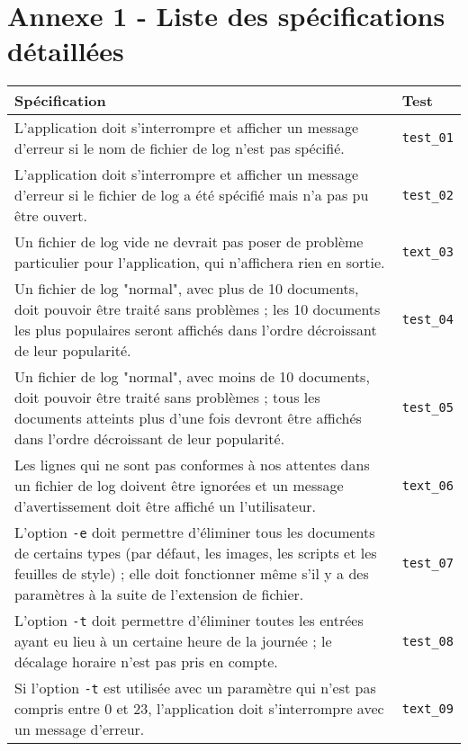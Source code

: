 \documentclass[11pt,a4paper]{article}
\begin{document}
\pagebreak
\section*{Annexe 1 - Liste des spécifications détaillées}
\label{sec:annexe_1}

\begin{center}
    \begin{table}[!h]
        \begin{tabularx}{\textwidth}{ | X | p{1.5cm} | }
            \hline
            Spécification & Test \\ \hline
            L'application doit s'interrompre et afficher un message d'erreur si le nom de fichier de log n'est pas spécifié. & \texttt{test\_01} \\ \hline
            L'application doit s'interrompre et afficher un message d'erreur si le fichier de log a été spécifié mais n'a pas pu être ouvert. & \texttt{test\_02} \\ \hline
            Un fichier de log vide ne devrait pas poser de problème particulier pour l'application, qui n'affichera rien en sortie. & \texttt{text\_03} \\ \hline
            Un fichier de log "normal", avec plus de 10 documents, doit pouvoir être traité sans problèmes ; les 10 documents les plus populaires seront affichés dans l'ordre décroissant de leur popularité. & \texttt{test\_04} \\ \hline
            Un fichier de log "normal", avec moins de 10 documents, doit pouvoir être traité sans problèmes ; tous les documents atteints plus d'une fois devront être affichés dans l'ordre décroissant de leur popularité. & \texttt{test\_05} \\ \hline
            Les lignes qui ne sont pas conformes à nos attentes dans un fichier de log doivent être ignorées et un message d'avertissement doit être affiché un l'utilisateur. & \texttt{text\_06} \\ \hline
            L'option \texttt{-e} doit permettre d'éliminer tous les documents de certains types (par défaut, les images, les scripts et les feuilles de style) ; elle doit fonctionner même s'il y a des paramètres à la suite de l'extension de fichier. & \texttt{test\_07} \\ \hline
            L'option \texttt{-t} doit permettre d'éliminer toutes les entrées ayant eu lieu à un certaine heure de la journée ; le décalage horaire n'est pas pris en compte. & \texttt{test\_08} \\ \hline
            Si l'option \texttt{-t} est utilisée avec un paramètre qui n'est pas compris entre 0 et 23, l'application doit s'interrompre avec un message d'erreur. & \texttt{text\_09} \\ \hline

\end{tabularx}
\end{table}
\end{center}
\end{document}
